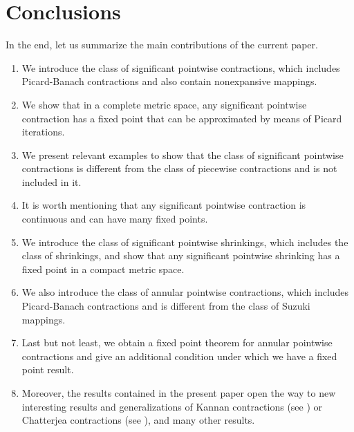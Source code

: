 \documentclass[12 pt]{article}
\theoremstyle{lema}
\theoremstyle{proposition}
\theoremstyle{theorem}
\theoremstyle{theorem}
\theoremstyle{corollary}
\theoremstyle{definition}
\theoremstyle{example}
\begin{document}
	\section{Conclusions}
	
	In the end, let us summarize the main contributions of the current paper.
	
	\begin{enumerate}
		\item We introduce the class of significant pointwise contractions, which includes Picard-Banach contractions and also contain nonexpansive mappings.
		\item We show that in a complete metric space, any significant pointwise contraction has a fixed point that can be approximated by means of Picard iterations.
		\item We present relevant examples to show that the class of significant pointwise contractions is different from the class of piecewise contractions and is not included in it.
		\item It is worth mentioning that any significant pointwise contraction is continuous and can have many fixed points.
		\item We introduce the class of significant pointwise shrinkings, which includes the class of shrinkings, and show that any significant pointwise shrinking has a fixed point in a compact metric space.
		\item We also introduce the class of annular pointwise contractions, which includes Picard-Banach contractions and is different from the class of Suzuki mappings.
		\item Last but not least, we obtain a fixed point theorem for annular pointwise contractions and give an additional condition under which we have a fixed point result.
		\item Moreover, the results contained in the present paper open the way to new interesting results and generalizations of Kannan contractions (see \cite{Popescu1}) or Chatterjea contractions (see \cite{Popescu2}), and many other results.
	\end{enumerate}
	
\end{document}
